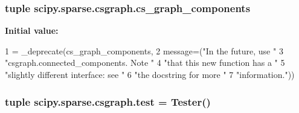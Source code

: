 \subsubsection[{cs\+\_\+graph\+\_\+components}]{\setlength{\rightskip}{0pt plus 5cm}tuple scipy.\+sparse.\+csgraph.\+cs\+\_\+graph\+\_\+components}\label{namespacescipy_1_1sparse_1_1csgraph_a5180c25e1d6d99f0df41c6127fac17d9}
{\bfseries Initial value\+:}
\begin{DoxyCode}
1 = \_deprecate(cs\_graph\_components,
2                                  message=(\textcolor{stringliteral}{"In the future, use "}
3                                           \textcolor{stringliteral}{"csgraph.connected\_components. Note "}
4                                           \textcolor{stringliteral}{"that this new function has a "}
5                                           \textcolor{stringliteral}{"slightly different interface: see "}
6                                           \textcolor{stringliteral}{"the docstring for more "}
7                                           \textcolor{stringliteral}{"information."}))
\end{DoxyCode}
\hypertarget{namespacescipy_1_1sparse_1_1csgraph_ad13a5a91bd84dd248acba206b634476d}{}
\subsubsection[{test}]{\setlength{\rightskip}{0pt plus 5cm}tuple scipy.\+sparse.\+csgraph.\+test = Tester()}\label{namespacescipy_1_1sparse_1_1csgraph_ad13a5a91bd84dd248acba206b634476d}
